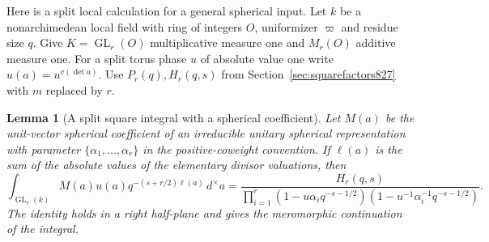 \documentclass[a4paper,11pt]{article}
\newtheorem{lemma}[proposition]{Lemma}
\theoremstyle{definition}
\theoremstyle{remark}
\numberwithin{equation}{section}
\begin{document}
Here is a split local calculation for a general spherical
input. Let \(k\) be a nonarchimedean local field with ring of
integers \(O\), uniformizer \(\varpi\) and residue size \(q\).
Give \(K=\operatorname{GL}_r(O)\) multiplicative measure one
and \(M_r(O)\) additive measure one. For a split torus phase
\(u\) of absolute value one write \(u(a)=u^{v(\det a)}\).
Use \(P_r(q),H_r(q,s)\) from Section~\ref{sec:squarefactors827}
with \(m\) replaced by \(r\).

\begin{lemma}[A split square integral with a spherical coefficient]
\leavevmode\label{lem:splitspherical832}
Let \(M(a)\) be the unit-vector spherical coefficient of
an irreducible unitary spherical representation with parameter
\(\{\alpha_1,\ldots,\alpha_r\}\) in the positive-coweight
convention. If \(\ell(a)\) is the sum of the absolute values
of the elementary divisor valuations, then
\[
 \int_{\operatorname{GL}_r(k)}
 M(a)u(a)q^{-(s+r/2)\ell(a)}\,d^\times a
 =
 \frac{H_r(q,s)}
 {\displaystyle\prod_{i=1}^r
  (1-u\alpha_i q^{-s-1/2})
  (1-u^{-1}\alpha_i^{-1}q^{-s-1/2})}.
\]
The identity holds in a right half-plane and gives the
meromorphic continuation of the integral.
\end{lemma}
\end{document}

